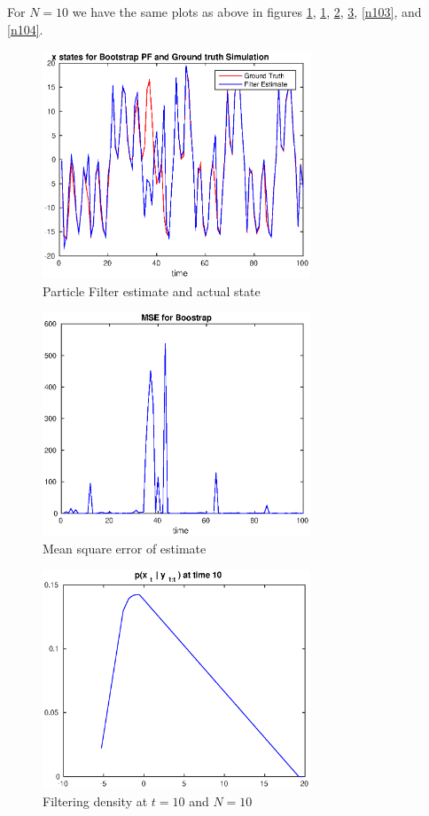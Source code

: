\documentclass[11pt, english]{article}
\begin{document}
\subsection{}

For $N=10$ we have the same plots as above in figures \ref{n10gtbt}, \ref{n10gtbt}, \ref{n101}, \ref{n102}, \ref{n103}, and \ref{n104}.

\begin{figure}[h]
  
  \centering
    \includegraphics[width=80mm]{./figs/008_15_gt-and-bt.eps}
    \caption{Particle Filter estimate and actual state}
    \label{n10gtbt}
\end{figure}

\begin{figure}[h]
  
  \centering
    \includegraphics[width=80mm]{./figs/009_13_mse.eps}
    \caption{Mean square error of estimate}
    \label{n101}
\end{figure}

\begin{figure}[h]
  
  \centering
    \includegraphics[width=80mm]{./figs/010_15_t10N10.eps}
    \caption{Filtering density at $t=10$ and $N=10$}
    \label{n102}
\end{figure}
\end{document}

